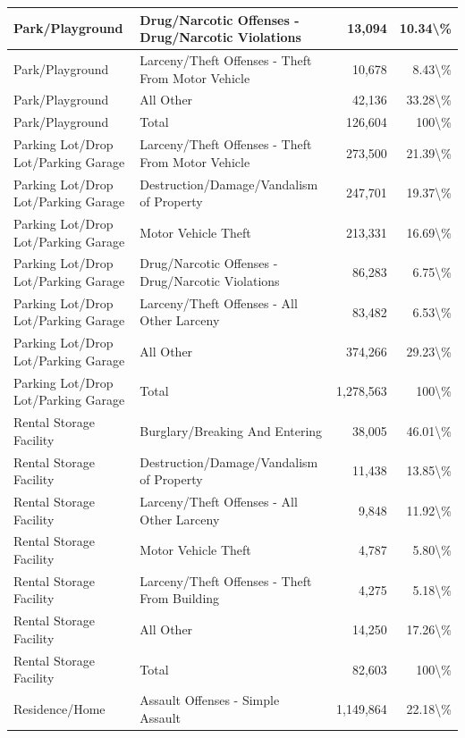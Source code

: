 \documentclass[
]{krantz}
\begin{document}
\begin{longtable}[t]{l|l|r|r}
\hline
Park/Playground & Drug/Narcotic Offenses - Drug/Narcotic Violations & 13,094 & 10.34\textbackslash{}\%\\
\hline
Park/Playground & Larceny/Theft Offenses - Theft From Motor Vehicle & 10,678 & 8.43\textbackslash{}\%\\
\hline
Park/Playground & All Other & 42,136 & 33.28\textbackslash{}\%\\
\hline
Park/Playground & Total & 126,604 & 100\textbackslash{}\%\\
\hline
Parking Lot/Drop Lot/Parking Garage & Larceny/Theft Offenses - Theft From Motor Vehicle & 273,500 & 21.39\textbackslash{}\%\\
\hline
Parking Lot/Drop Lot/Parking Garage & Destruction/Damage/Vandalism of Property & 247,701 & 19.37\textbackslash{}\%\\
\hline
Parking Lot/Drop Lot/Parking Garage & Motor Vehicle Theft & 213,331 & 16.69\textbackslash{}\%\\
\hline
Parking Lot/Drop Lot/Parking Garage & Drug/Narcotic Offenses - Drug/Narcotic Violations & 86,283 & 6.75\textbackslash{}\%\\
\hline
Parking Lot/Drop Lot/Parking Garage & Larceny/Theft Offenses - All Other Larceny & 83,482 & 6.53\textbackslash{}\%\\
\hline
Parking Lot/Drop Lot/Parking Garage & All Other & 374,266 & 29.23\textbackslash{}\%\\
\hline
Parking Lot/Drop Lot/Parking Garage & Total & 1,278,563 & 100\textbackslash{}\%\\
\hline
Rental Storage Facility & Burglary/Breaking And Entering & 38,005 & 46.01\textbackslash{}\%\\
\hline
Rental Storage Facility & Destruction/Damage/Vandalism of Property & 11,438 & 13.85\textbackslash{}\%\\
\hline
Rental Storage Facility & Larceny/Theft Offenses - All Other Larceny & 9,848 & 11.92\textbackslash{}\%\\
\hline
Rental Storage Facility & Motor Vehicle Theft & 4,787 & 5.80\textbackslash{}\%\\
\hline
Rental Storage Facility & Larceny/Theft Offenses - Theft From Building & 4,275 & 5.18\textbackslash{}\%\\
\hline
Rental Storage Facility & All Other & 14,250 & 17.26\textbackslash{}\%\\
\hline
Rental Storage Facility & Total & 82,603 & 100\textbackslash{}\%\\
\hline
Residence/Home & Assault Offenses - Simple Assault & 1,149,864 & 22.18\textbackslash{}\%\\

\end{longtable}
\end{document}
